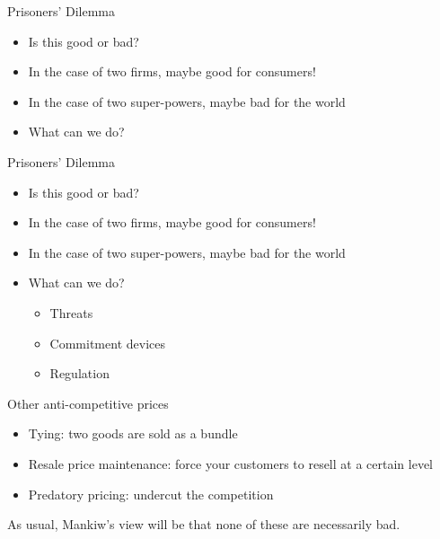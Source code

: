 \documentclass[aspectratio=169]{beamer}
\begin{document}
\begin{frame}{Prisoners' Dilemma}
    \begin{itemize}
        \item Is this good or bad?
        \item In the case of two firms, maybe good for consumers!
        \item In the case of two super-powers, maybe bad for the world
        \item What can we do?
    \end{itemize}
\end{frame}

\begin{frame}{Prisoners' Dilemma}
    \begin{itemize}
        \item Is this good or bad?
        \item In the case of two firms, maybe good for consumers!
        \item In the case of two super-powers, maybe bad for the world
        \item What can we do?
        \begin{itemize}
            \item Threats
            \item Commitment devices
            \item Regulation
        \end{itemize}
    \end{itemize}
\end{frame}

\begin{frame}{Other anti-competitive prices}
    \begin{itemize}
        \item Tying: two goods are sold as a bundle
        \item Resale price maintenance: force your customers to resell at a certain level
        \item Predatory pricing: undercut the competition
    \end{itemize}
    As usual, Mankiw's view will be that none of these are necessarily bad.
\end{frame}
\end{document}

